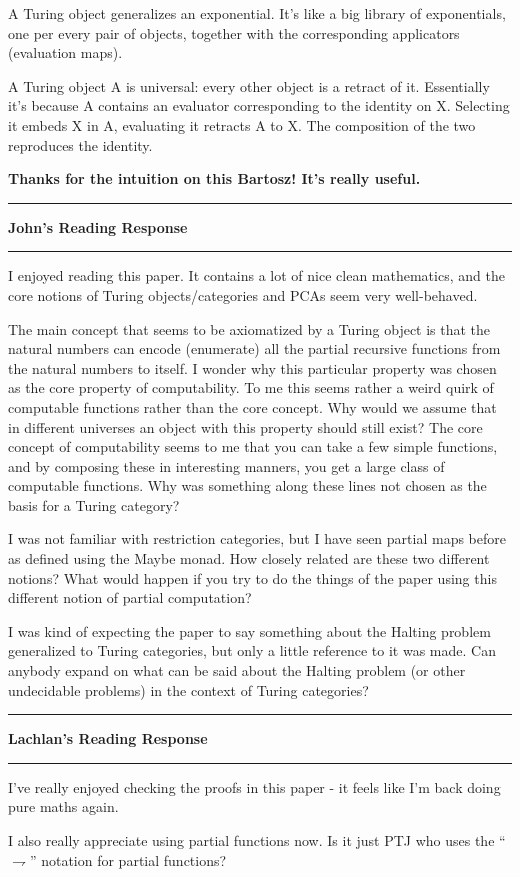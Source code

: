 \documentclass{amsart}
\newcommand{\iam}[1]{
  \vspace{0.25em}
  \hrule
  \vspace{0.25em}
  \textbf{{#1}'s Reading Response}
  \vspace{0.25em}
  \hrule
  \vspace{1em}
}
\newcommand{\respond}[1]{
  \vspace{1em} \textbf{#1}
}
\begin{document}
A Turing object generalizes an exponential. It's like a big library of exponentials, one per every pair of objects, together with the corresponding applicators (evaluation maps).

A Turing object A is universal: every other object is a retract of it. Essentially it's because A contains an evaluator corresponding to the identity on X. Selecting it embeds X in A, evaluating it retracts A to X. The composition of the two reproduces the identity.

\respond{Thanks for the intuition on this Bartosz! It's really useful.}

\iam{John}
I enjoyed reading this paper. It contains a lot of nice clean mathematics, and the core notions of Turing objects/categories and PCAs seem very well-behaved.

The main concept that seems to be axiomatized by a Turing object is that the natural numbers can encode (enumerate) all the partial recursive functions from the natural numbers to itself. I wonder why this particular property was chosen as the core property of computability. To me this seems rather a weird quirk of computable functions rather than the core concept. Why would we assume that in different universes an object with this property should still exist? The core concept of computability seems to me that you can take a few simple functions, and by composing these in interesting manners, you get a large class of computable functions. Why was something along these lines not chosen as the basis for a Turing category?

I was not familiar with restriction categories, but I have seen partial maps before as defined using the Maybe monad. How closely related are these two different notions? What would happen if you try to do the things of the paper using this different notion of partial computation?

I was kind of expecting the paper to say something about the Halting problem generalized to Turing categories, but only a little reference to it was made. Can anybody expand on what can be said about the Halting problem (or other undecidable problems) in the context of Turing categories?

\iam{Lachlan}

I’ve really enjoyed checking the proofs in this paper - it feels like I’m back doing pure maths again.

I also really appreciate using partial functions now. Is it just PTJ who uses the ``$\rightharpoondown$'' notation for partial functions?
\end{document}
